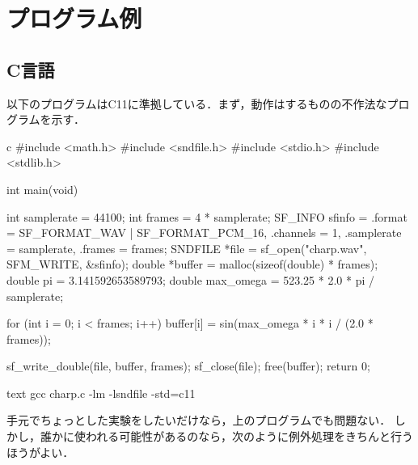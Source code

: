 \documentclass[../../main]{subfiles}
\begin{document}
\chapter{プログラム例}
\section{C言語}
以下のプログラムはC11に準拠している．まず，動作はするものの不作法なプログラムを示す．

\begin{codeblock}{c}
#include <math.h>
#include <sndfile.h>
#include <stdio.h>
#include <stdlib.h>

int main(void) {
  int samplerate = 44100;
  int frames = 4 * samplerate;
  SF_INFO sfinfo = {.format = SF_FORMAT_WAV | SF_FORMAT_PCM_16,
                    .channels = 1,
                    .samplerate = samplerate,
                    .frames = frames};
  SNDFILE *file = sf_open("charp.wav", SFM_WRITE, &sfinfo);
  double *buffer = malloc(sizeof(double) * frames);
  double pi = 3.141592653589793;
  double max_omega = 523.25 * 2.0 * pi / samplerate;

  for (int i = 0; i < frames; i++) {
    buffer[i] = sin(max_omega * i * i / (2.0 * frames));
  }

  sf_write_double(file, buffer, frames);
  sf_close(file);
  free(buffer);
  return 0;
}
\end{codeblock}

\begin{codeblock}{text}
gcc charp.c -lm -lsndfile -std=c11
\end{codeblock}

手元でちょっとした実験をしたいだけなら，上のプログラムでも問題ない．
しかし，誰かに使われる可能性があるのなら，次のように例外処理をきちんと行うほうがよい．
\end{document}
